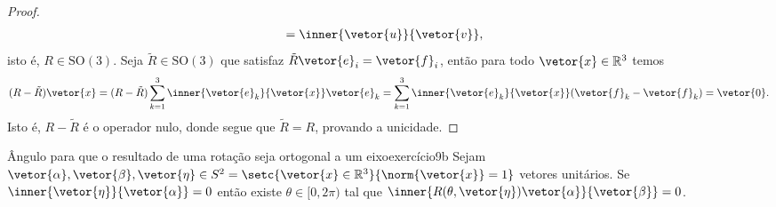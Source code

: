 \begin{proof}
\begin{align*}
        &= \inner{\vetor{u}}{\vetor{v}},
    \end{align*}
    isto é, \(R \in \mathrm{SO}(3)\). Seja \(\tilde{R} \in \mathrm{SO}(3)\) que satisfaz \(\tilde{R}\vetor{e}_i = \vetor{f}_i\), então para todo \(\vetor{x} \in \mathbb{R}^3\) temos
    \begin{equation*}
        (R - \tilde{R})\vetor{x} = (R - \tilde{R}) \sum_{k = 1}^3 \inner{\vetor{e}_k}{\vetor{x}}\vetor{e}_k = \sum_{k = 1}^3 \inner{\vetor{e}_k}{\vetor{x}} (\vetor{f}_k - \vetor{f}_k) = \vetor{0}.
    \end{equation*}
    Isto é, \(R - \tilde{R}\) é o operador nulo, donde segue que \(\tilde{R} = R\), provando a unicidade.
\end{proof}

\begin{lemma}{Ângulo para que o resultado de uma rotação seja ortogonal a um eixo}{exercício9b}
    Sejam \(\vetor{\alpha}, \vetor{\beta}, \vetor{\eta} \in S^2 = \setc{\vetor{x} \in \mathbb{R}^3}{\norm{\vetor{x}}= 1}\) vetores unitários. Se \(\inner{\vetor{\eta}}{\vetor{\alpha}} = 0\) então existe \(\theta \in [0,2\pi)\) tal que \(\inner{R(\theta, \vetor{\eta})\vetor{\alpha}}{\vetor{\beta}} = 0\).
\end{lemma}
